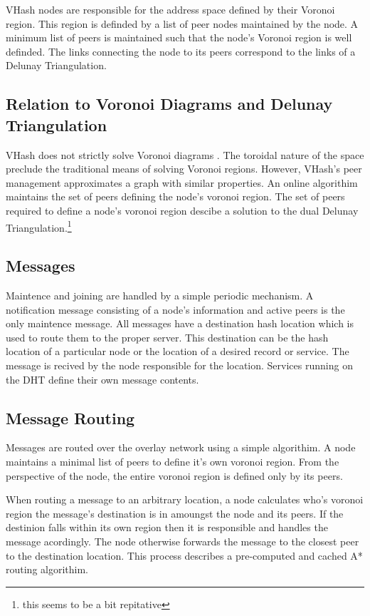 \documentclass[11pt]{IEEEtran} %
\begin{document}
VHash nodes are responsible for the address space defined by their Voronoi region. This region is definded by a list of peer nodes maintained by the node. A minimum list of peers is maintained such that the node's Voronoi region is well definded. The links connecting the node to its peers correspond to the links of a Delunay Triangulation. 

\subsection{Relation to Voronoi Diagrams and Delunay Triangulation}

VHash does not strictly solve Voronoi diagrams \cite{voronoi}. The toroidal nature of the space preclude the traditional means of solving Voronoi regions. However, VHash's peer management approximates a graph with similar properties. 
An online algorithim maintains the set of peers defining the node's voronoi region. The set of peers required to define a node's voronoi region descibe a solution to the dual Delunay Triangulation.\footnote{this seems to be a bit repitative}

\subsection{Messages}
Maintence and joining are handled by a simple periodic mechanism. A notification message consisting of a node's information and active peers is the only maintence message. All messages have a destination hash location which is used to route them to the proper server. This destination can be the hash location of a particular node or the location of a desired record or service.  The message is recived by the node responsible for the location. Services running on the DHT define their own message contents.

\subsection{Message Routing}
Messages are routed over the overlay network using a simple algorithim. A node maintains a minimal list of peers to define it's own voronoi region.  From the perspective of the node, the entire voronoi region is defined only by its peers.

When routing a message to an arbitrary location, a node calculates who's voronoi region the message's destination is in amoungst the node and its peers. If the destinion falls within its own region then it is responsible and handles the message acordingly. The node otherwise forwards the message to the closest peer to the destination location. This process describes a pre-computed and cached A* \cite{astar} routing algorithim.
\end{document}

